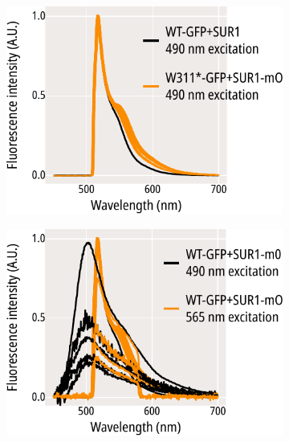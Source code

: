 \begin{figure}[hbtp]
\begin{subfigure}[t]{0.3\textwidth}
		\includegraphics[width=\textwidth]{w311_gfp_mo_spectra_1.pdf}
	\end{subfigure}
	\vfill
	\begin{subfigure}[t]{0.3\textwidth}
		\caption{}\label{ch6fig:wt_gfp_mo_spectra_2}
		\centering
		\includegraphics[width=\textwidth]{wt_gfp_mo_spectra_2.pdf}
	\end{subfigure}
	\hfill
	\begin{subfigure}[t]{0.3\textwidth}
		\caption{}\label{ch6fig:w311_gfp_mo_spectra_2}
		\centering

\end{subfigure}
\end{figure}
